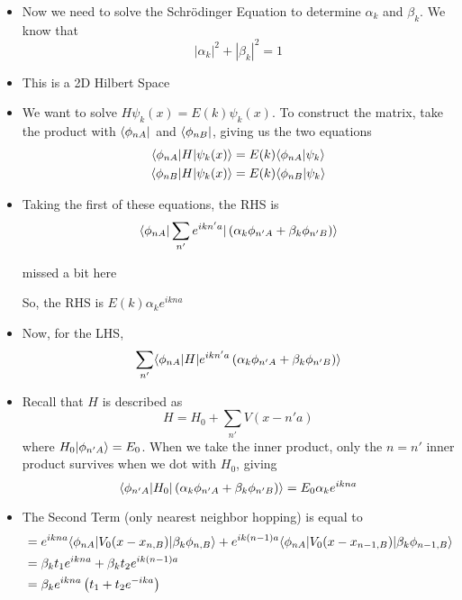 \documentclass[11pt]{article}
\begin{document}
\begin{itemize}
  \item Now we need to solve the Schr\"odinger Equation to determine $\alpha_{k}$ and $\beta_k$. We know that $$ |\alpha_k|^2 + |\beta_k|^2  = 1 $$ 
  \item This is a 2D Hilbert Space
  \item We want to solve $H \psi_k(x) = E(k) \psi_k(x) $. To construct the matrix, take the product with $\langle\phi_{nA}\rvert$ and $\langle\phi_{nB}\rvert$, giving us the two equations 
  \begin{align*}
    \langle \phi_{nA} | H|\psi_k(x) \rangle &= E(k) \langle \phi_{nA} | \psi_k \rangle \\
    \langle \phi_{nB} | H|\psi_k(x) \rangle &= E(k) \langle \phi_{nB} | \psi_k \rangle \\
  \end{align*}

  \item Taking the first of these equations, the RHS is 
  \begin{align*}
    \langle \phi_{nA} |  \sum_{n'} e^{ikn'a} | \left( \alpha_k \phi_{n'A} + \beta_{k} \phi_{n'B} \right)  \rangle
  \end{align*} \begin{note}
    {missed a bit here}
  \end{note} So, the RHS is $E(k) \alpha_k e^{ikna} $

  \item Now, for the LHS, 
  \begin{align*}
    \sum_{n'} \langle \phi_{nA} | H|e^{ikn'a} \left(\alpha_{k} \phi_{n'A} + \beta_{k} \phi_{n' B}\right)  \rangle 
  \end{align*} 
  \item Recall that $H$ is described as $$ H = H_0 + \sum_{n'} V(x-n'a) $$ where $H_0 \lvert\phi_{n'A}\rangle = E_0 $. When we take the inner product, only the $n=n'$ inner product survives when we dot with $H_0$, giving $$ \langle \phi_{n'A} | H_0|\left(\alpha_{k} \phi_{n'A} + \beta_{k} \phi_{n' B}\right) \rangle = E_0 \alpha_k e^{ikna} $$
  \item The Second Term (only nearest neighbor hopping) is equal to 
  \begin{align*}
    &= e^{ikna} \langle \phi_{nA} | V_0(x-x_{n,B})| \beta_k \phi_{n,B}  \rangle + e^{ik(n-1)a} \langle \phi_{nA} | V_0(x-x_{n-1,B})| \beta_k \phi_{n-1,B}  \rangle \\
    &= \beta_k t_1 e^{ikna} + \beta_k t_2 e^{ik(n-1)a} \\
    &= \beta_k e^{ikna} \left( t_1 + t_2 e^{-ika} \right)
  \end{align*} 
\end{itemize}
\end{document}
